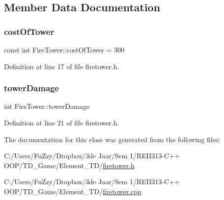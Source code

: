 \subsection{Member Data Documentation}
\mbox{\label{class_fire_tower_ae05eab1ea0a68b5109ee91771d3c8569}} 
\subsubsection{\texorpdfstring{cost\+Of\+Tower}{costOfTower}}
{\footnotesize\ttfamily const int Fire\+Tower\+::cost\+Of\+Tower = 300}



Definition at line 17 of file firetower.\+h.

\mbox{\label{class_fire_tower_a59a01cc273823ea5451179dbc1f4aded}} 
\subsubsection{\texorpdfstring{tower\+Damage}{towerDamage}}
{\footnotesize\ttfamily int Fire\+Tower\+::tower\+Damage\hspace{0.3cm}{\ttfamily [private]}}



Definition at line 21 of file firetower.\+h.



The documentation for this class was generated from the following files\+:\begin{DoxyCompactItemize}
\item 
C\+:/\+Users/\+Fu\+Zzy/\+Dropbox/3de Jaar/\+Sem 1/\+R\+E\+I\+I313-\/\+C++ O\+O\+P/\+T\+D\+\_\+\+Game/\+Element\+\_\+\+T\+D/\hyperlink{firetower_8h}{firetower.\+h}\item 
C\+:/\+Users/\+Fu\+Zzy/\+Dropbox/3de Jaar/\+Sem 1/\+R\+E\+I\+I313-\/\+C++ O\+O\+P/\+T\+D\+\_\+\+Game/\+Element\+\_\+\+T\+D/\hyperlink{firetower_8cpp}{firetower.\+cpp}\end{DoxyCompactItemize}

